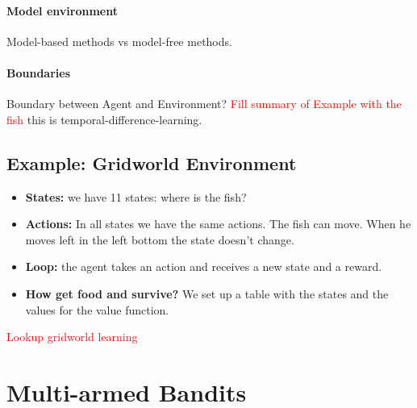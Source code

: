 \documentclass[10pt,a4paper]{article}
\begin{document}
\paragraph{Model environment}
Model-based methods vs model-free methods.

\paragraph{Boundaries}
Boundary between Agent and Environment?  \textcolor{red}{Fill summary of Example with the fish} this is temporal-difference-learning.

\subsection{Example: Gridworld Environment}
\begin{itemize}
\item \textbf{States:} we have 11 states: where is the fish?
\item \textbf{Actions:} In all states we have the same actions. The fish can move. When he moves left in the left bottom the state doesn't change.
\item \textbf{Loop:} the agent takes an action and receives a new state and a reward.
\item \textbf{How get food and survive?} We set up a table with the states and the values for the value function.
\end{itemize}

\textcolor{red}{Lookup gridworld learning}

\section{Multi-armed Bandits}
\end{document}
